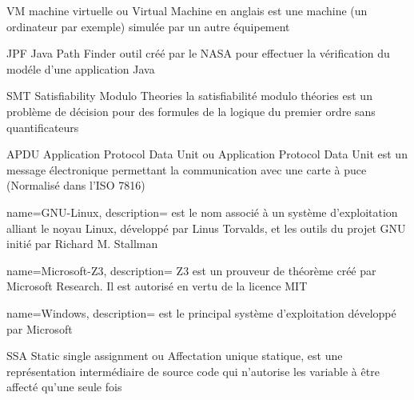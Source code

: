 


    {VM}
    {machine virtuelle}
    { ou Virtual Machine en anglais est une machine (un ordinateur par exemple) simulée par un autre équipement}
    
    {JPF}
    {Java Path Finder}
    { outil créé par le NASA pour effectuer la vérification du modéle d'une application Java}
    
    {SMT}
    {Satisfiability Modulo Theories}
    { la satisfiabilité modulo théories est un problème de décision pour des formules de la logique du premier ordre sans quantificateurs}
    
    {APDU}
    {Application Protocol Data Unit}
    { ou Application Protocol Data Unit est un message électronique permettant la communication avec une carte à puce (Normalisé dans l'ISO 7816)}

{
        name=GNU-Linux,
        description={ est le nom associé à un système d'exploitation alliant le noyau Linux, développé par Linus Torvalds, et les outils du projet GNU initié par Richard M. Stallman}
}

{
        name=Microsoft-Z3,
        description={ Z3 est un prouveur de théorème créé par Microsoft Research. Il est autorisé en vertu de la licence MIT}
}

{
        name=Windows,
        description={ est le principal système d'exploitation développé par Microsoft}
}


	{SSA}
	{Static single assignment}
	{ ou Affectation unique statique, est une représentation intermédiaire de source code qui n'autorise les variable à être affecté qu'une seule fois}